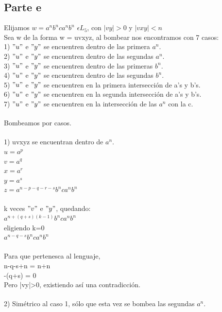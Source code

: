 \documentclass[11pt,letterpaper]{article}
\begin{document}
\subsection{Parte e}
Elijamos $w = a^nb^nca^nb^n$ $\epsilon L_{5}$, con $|vy|>0$ y $|vxy|<n$ \\
Sea w de la forma w = uvxyz, al bombear nos encontramos con 7 casos: \\
1) $"u"$ e $"y"$ se encuentren dentro de las primera $a^n$. \\
2) $"u"$ e $"y"$ se encuentren dentro de las segundas $a^n$. \\
3) $"u"$ e $"y"$ se encuentren dentro de las primeras $b^n$. \\
4) $"u"$ e $"y"$ se encuentren dentro de las segundas $b^n$. \\
5) $"u"$ e $"y"$ se encuentren en la primera intersección de a's y b's. \\
6) $"u"$ e $"y"$ se encuentren en la segunda intersección de a's y b's. \\
7) $"u"$ e $"y"$ se encuentren en la intersección de las $a^n$ con la c. \\
 \\
Bombeamos por casos. \\
 \\
1) uvxyz se encuentran dentro de $a^n$. \\
\indent $u=a^p$ \\
\indent $v=a^q$ \\
\indent $x=a^r$ \\
\indent $y=a^s$ \\
\indent $z=a^{n-p-q-r-s}b^nca^nb^n$ \\
 \\
\indent k veces $"v"$ e $"y"$, quedando: \\
\indent $a^{n+(q+s)(k-1)}b^nca^nb^n$ \\
\indent eligiendo k=0 \\
\indent $a^{n-q-s}b^nca^nb^n$ \\
 \\
\indent Para que pertenesca al lenguaje, \\
\indent n-q-s+n = n+n \\
\indent -(q+s) = 0 \\
\indent Pero |vy|>0, existiendo así una contradicción. \\
 \\
2) Simétrico al caso 1, sólo que esta vez se bombea las segundas $a^n$. \\
 \\
\end{document}

